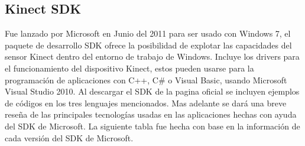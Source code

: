 \documentclass[11pt,a4paper]{article}
\begin{document}
\subsection{Kinect SDK}
Fue lanzado por Microsoft en Junio del 2011 para ser usado con Windows 7, el paquete de desarrollo SDK ofrece la posibilidad de explotar las capacidades del sensor Kinect dentro del entorno de trabajo de Windows. Incluye los drivers
 para el funcionamiento del dispositivo Kinect, estos pueden usarse para la programación de aplicaciones con C++, C\# o Visual Basic, usando Microsoft Visual Studio 2010. Al descargar el SDK de la pagina oficial se incluyen ejemplos de códigos en los tres lenguajes mencionados. Mas adelante se dará una breve reseña de las principales tecnologías usadas en las aplicaciones hechas con ayuda del SDK de Microsoft.
La siguiente tabla fue hecha con base en la información de cada versión del SDK de Microsoft.
\newline
\newline%
\end{document}
